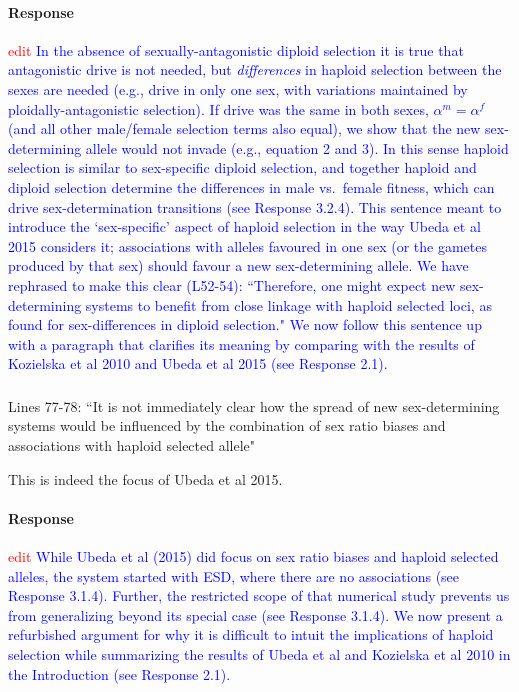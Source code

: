\documentclass[10pt,letterpaper]{article}
\begin{document}
\noindent\paragraph{Response}
\textcolor{red}{edit}
\textcolor{blue}{In the absence of sexually-antagonistic diploid selection it is true that antagonistic drive is not needed, but \textit{differences} in haploid selection between the sexes are needed (e.g., drive in only one sex, with variations maintained by ploidally-antagonistic selection). 
If drive was the same in both sexes, $\alpha^{m}=\alpha^{f}$ (and all other male/female selection terms also equal), we show that the new sex-determining allele would not invade (e.g., equation 2 and 3). 
In this sense haploid selection is similar to sex-specific diploid selection, and together haploid and diploid selection determine the differences in male vs.\ female fitness, which can drive sex-determination transitions (see Response 3.2.4).
This sentence meant to introduce the `sex-specific' aspect of haploid selection in the way Ubeda et al 2015 considers it; associations with alleles favoured in one sex (or the gametes produced by that sex) should favour a new sex-determining allele.
We have rephrased to make this clear (L52-54): ``Therefore, one might expect new sex-determining systems to benefit from close linkage with haploid selected loci, as found for sex-differences in diploid selection."
We now follow this sentence up with a paragraph that clarifies its meaning by comparing with the results of Kozielska et al 2010 and Ubeda et al 2015 (see Response 2.1).}

\noindent\subsubsection{}
Lines 77-78: ``It is not immediately clear how the spread of new sex-determining systems would be influenced by the combination of sex ratio biases and associations with haploid selected allele"

This is indeed the focus of Ubeda et al 2015.

\noindent\paragraph{Response}
\textcolor{red}{edit}
\textcolor{blue}{While Ubeda et al (2015) did focus on sex ratio biases and haploid selected alleles, the system started with ESD, where there are no associations (see Response 3.1.4).
Further, the restricted scope of that numerical study prevents us from generalizing beyond its special case (see Response 3.1.4).
We now present a refurbished argument for why it is difficult to intuit the implications of haploid selection while summarizing the results of Ubeda et al and Kozielska et al 2010 in the Introduction (see Response 2.1).
}
\end{document}
